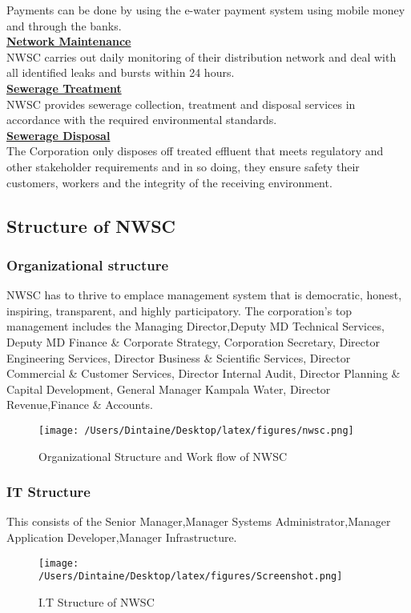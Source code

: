 \documentclass{article}
\begin{document}
Payments can be done by using the e-water payment system using mobile money and through the banks.\\
\underline{\textbf{Network Maintenance}}\\
NWSC carries out daily monitoring of their distribution network and deal with all identified leaks and bursts within 24 hours.\\
\underline{\textbf{Sewerage Treatment}}\\
NWSC provides sewerage collection, treatment and disposal services in accordance with the required environmental standards.\\
\underline{\textbf{Sewerage Disposal}}\\
The Corporation only disposes off treated effluent that meets regulatory and other stakeholder requirements and in so doing, they ensure safety their  customers, workers and the integrity of the receiving environment.     
\subsection{Structure of NWSC}
\subsubsection{Organizational structure}
NWSC has to thrive to emplace management system that is democratic, honest, inspiring, transparent, and highly participatory. The corporation's top management includes the Managing Director,Deputy MD Technical Services, Deputy MD Finance \& Corporate Strategy, Corporation Secretary, Director Engineering Services, Director Business \& Scientific Services, Director Commercial \& Customer Services, Director Internal Audit, Director Planning \& Capital Development, General Manager Kampala Water, Director Revenue,Finance \& Accounts.
\begin{figure}[h!]
\texttt{[image: /Users/Dintaine/Desktop/latex/figures/nwsc.png]}
\caption{Organizational Structure and Work flow of NWSC}
\label{fig:structure}
\end{figure}
\subsubsection{IT Structure}
This consists of the Senior Manager,Manager Systems Administrator,Manager Application Developer,Manager Infrastructure.
\begin{figure}[h!]
\texttt{[image: /Users/Dintaine/Desktop/latex/figures/Screenshot.png]}
\caption{I.T Structure of NWSC}
\label{fig:IT structure}
\end{figure}
\end{document}

